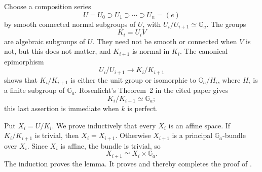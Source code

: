 Choose a composition series
\[
  U=U_0\supset U_1\supset\cdots\supset U_n=(e)
\]
by smooth connected normal subgroups of \(U\), with
\(U_i/U_{i+1}\simeq\mathbb G_a\). The groups
\[
  K_i=U_iV
\]
are algebraic subgroups of \(U\). They need not be smooth or
connected when \(V\) is not, but this does not matter, and
\(K_{i+1}\) is normal in \(K_i\). The canonical epimorphism
\[
  U_i/U_{i+1}\longrightarrow K_i/K_{i+1}
\]
shows that \(K_i/K_{i+1}\) is either the unit group or isomorphic
to \(\mathbb G_a/H_i\), where \(H_i\) is a finite subgroup of
\(\mathbb G_a\). Rosenlicht's Theorem~2 in the cited paper gives
\[
  K_i/K_{i+1}\simeq\mathbb G_a;
\]
this last assertion is immediate when \(k\) is perfect.

Put \(X_i=U/K_i\). We prove inductively that every \(X_i\) is an
affine space. If \(K_i/K_{i+1}\) is trivial, then
\(X_i=X_{i+1}\). Otherwise \(X_{i+1}\) is a principal
\(\mathbb G_a\)-bundle over \(X_i\). Since \(X_i\) is affine,
the bundle is trivial, so
\[
  X_{i+1}\simeq X_i\times\mathbb G_a.
\]
The induction proves the lemma. It proves  and thereby
completes the proof of .
